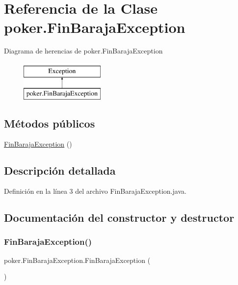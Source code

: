 \hypertarget{classpoker_1_1FinBarajaException}{}\section{Referencia de la Clase poker.\+Fin\+Baraja\+Exception}
\label{classpoker_1_1FinBarajaException}
Diagrama de herencias de poker.\+Fin\+Baraja\+Exception\begin{figure}[H]
\begin{center}
\leavevmode
\includegraphics[height=2.000000cm]{classpoker_1_1FinBarajaException}
\end{center}
\end{figure}
\subsection*{Métodos públicos}
\begin{DoxyCompactItemize}
\item 
\mbox{\hyperlink{classpoker_1_1FinBarajaException_ad894c29a2b81d94e273558eba21b02a3}{Fin\+Baraja\+Exception}} ()
\end{DoxyCompactItemize}


\subsection{Descripción detallada}


Definición en la línea 3 del archivo Fin\+Baraja\+Exception.\+java.



\subsection{Documentación del constructor y destructor}
\mbox{\label{classpoker_1_1FinBarajaException_ad894c29a2b81d94e273558eba21b02a3}} 
\subsubsection{\texorpdfstring{FinBarajaException()}{FinBarajaException()}}
{\footnotesize\ttfamily poker.\+Fin\+Baraja\+Exception.\+Fin\+Baraja\+Exception (\begin{DoxyParamCaption}{ }\end{DoxyParamCaption})}



